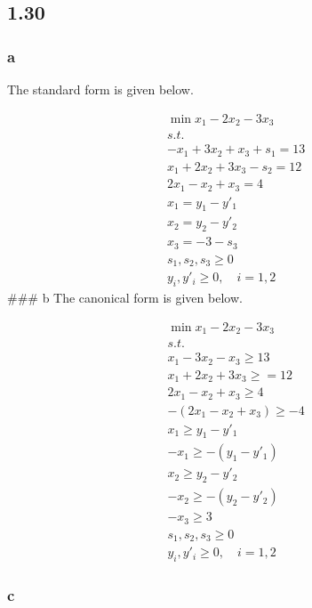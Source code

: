 \documentclass[11pt]{article}
\begin{document}
    \hypertarget{section}{%
\subsection{1.30}\label{section}}

\hypertarget{a}{%
\subsubsection{a}\label{a}}

The standard form is given below.

\[
\begin{align*}
    & \min x_1 -2x_2 - 3x_3\\
    & s.t. \\
    & -x_1 + 3x_2 + x_3 + s_1 = 13 \\
    & x_1 + 2x_2 + 3x_3 - s_2 = 12 \\
    & 2x_1 - x_2 + x_3 = 4 \\
    & x_1 = y_1 - y'_1\\
    & x_2 = y_2 - y'_2 \\
    & x_3 = -3-s_3 \\
    & s_1,s_2,s_3 \geq 0 \\ 
    & y_i, y'_i \geq 0, \quad i=1,2
 \end{align*}
\] \#\#\# b The canonical form is given below.

\[
\begin{align*}
    & \min x_1 -2x_2 - 3x_3\\
    & s.t. \\
    & x_1 - 3x_2 - x_3 \geq 13 \\
    & x_1 + 2x_2 + 3x_3 \geq = 12 \\
    & 2x_1 - x_2 + x_3  \geq 4 \\
    & -(2x_1 - x_2 + x_3) \geq -4 \\
    & x_1 \geq y_1 - y'_1\\
    & -x_1 \geq -(y_1 - y'_1)\\
    & x_2 \geq y_2 - y'_2 \\
    & -x_2 \geq -(y_2 - y'_2) \\
    & -x_3 \geq 3 \\
    & s_1,s_2,s_3 \geq 0 \\ 
    & y_i, y'_i \geq 0, \quad i=1,2
 \end{align*}
\]

\hypertarget{c}{%
\subsubsection{c}\label{c}}
\end{document}

